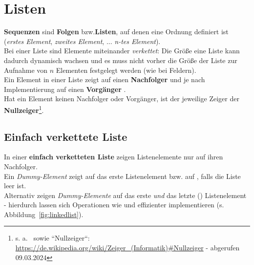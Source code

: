 \section{Listen}

\textbf{Sequenzen} sind \textbf{Folgen} bzw.\textbf{Listen}, auf denen eine Ordnung definiert ist (\textit{erstes Element}, \textit{zweites Element}, ... \textit{n-tes Element}).\\

\noindent
Bei einer Liste sind Elemente miteinander \textit{verkettet}: Die Größe eine Liste kann dadurch dynamisch wachsen und es muss nicht vorher die Größe der Liste zur Aufnahme von $n$ Elementen festgelegt werden (wie bei Feldern).\\

\noindent
Ein Element in einer Liste zeigt auf einen \textbf{Nachfolger}  und je nach Implementierung auf einen \textbf{Vorgänger} .\\
Hat ein Element keinen Nachfolger oder Vorgänger, ist der jeweilige Zeiger der \textbf{Nullzeiger}\footnote{
s. a.~\cite[49 f.]{GD18b} sowie ``Nullzeiger``: \url{https://de.wikipedia.org/wiki/Zeiger_(Informatik)#Nullzeiger} - abgerufen 09.03.2024
}.

\subsection{Einfach verkettete Liste}
In einer \textbf{einfach verketteten Liste} zeigen Listenelemente nur auf ihren Nachfolger.\\

\noindent
Ein \textit{Dummy-Element}  zeigt auf das erste Listenelement bzw. auf , falls die Liste leer ist.\\

\noindent
Alternativ zeigen \textit{Dummy-Elemente} auf das erste  \textit{und} das letzte () Listenelement - hierdurch lassen sich Operationen wie  und  effizienter implementieren (s. Abbildung~\ref{fig:linkedlist}).

